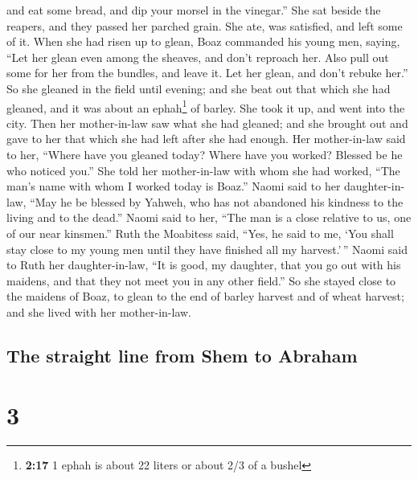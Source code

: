 and eat some bread, and dip your morsel in the vinegar.'' She sat beside
the reapers, and they passed her parched grain. She ate, was satisfied,
and left some of it.  When she had risen up to glean,
Boaz commanded his young men, saying, ``Let her glean even among the
sheaves, and don't reproach her.  Also pull out some for
her from the bundles, and leave it. Let her glean, and don't rebuke
her.''  So she gleaned in the field until evening; and
she beat out that which she had gleaned, and it was about an
ephah\footnote{\textbf{2:17} 1 ephah is about 22 liters or about 2/3 of
  a bushel} of barley.  She took it up, and went into the
city. Then her mother-in-law saw what she had gleaned; and she brought
out and gave to her that which she had left after she had enough.
 Her mother-in-law said to her, ``Where have you gleaned
today? Where have you worked? Blessed be he who noticed you.'' She told
her mother-in-law with whom she had worked, ``The man's name with whom I
worked today is Boaz.''  Naomi said to her
daughter-in-law, ``May he be blessed by Yahweh, who has not abandoned
his kindness to the living and to the dead.'' Naomi said to her, ``The
man is a close relative to us, one of our near kinsmen.''
 Ruth the Moabitess said, ``Yes, he said to me, `You
shall stay close to my young men until they have finished all my
harvest.'\,''  Naomi said to Ruth her daughter-in-law,
``It is good, my daughter, that you go out with his maidens, and that
they not meet you in any other field.''  So she stayed
close to the maidens of Boaz, to glean to the end of barley harvest and
of wheat harvest; and she lived with her mother-in-law.

\hypertarget{the-straight-line-from-shem-to-abraham}{%
\subsection{The straight line from Shem to
Abraham}\label{the-straight-line-from-shem-to-abraham}}

\hypertarget{section-2}{%
\section{3}\label{section-2}}


